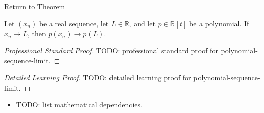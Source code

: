 \newpage
{}
\label{prf:polynomial-sequence-limit}

\begin{remark*}[Return]
\hyperref[thm:polynomial-sequence-limit]{Return to Theorem}
\end{remark*}

\begin{theorem*}
Let $(x_n)$ be a real sequence, let $L\in\mathbb{R}$, and let
$p\in\mathbb{R}[t]$ be a polynomial. If $x_n\to L$, then
$p(x_n)\to p(L)$.

\smallskip
\noindent
\end{theorem*}

\begin{proof}[Professional Standard Proof]
\LRAProofBodyStart
TODO: professional standard proof for polynomial-sequence-limit.
\end{proof}

\begin{proof}[Detailed Learning Proof]
\LRAProofBodyStart
TODO: detailed learning proof for polynomial-sequence-limit.
\end{proof}

\begin{remark*}
\end{remark*}

\begin{dependencies}
\begin{itemize}
  \item TODO: list mathematical dependencies.
\end{itemize}
\end{dependencies}

\clearpage

